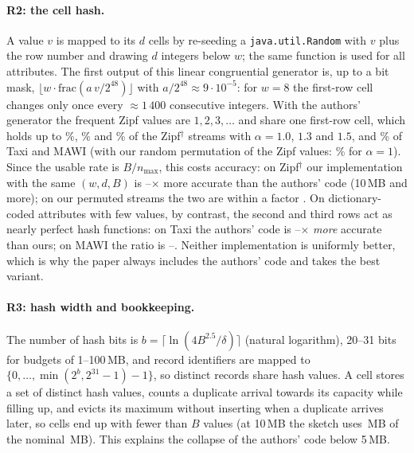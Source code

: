 \documentclass[sigconf,review,anonymous]{acmart}
\begin{document}
\paragraph{R2: the cell hash.} A value $v$ is mapped to its $d$ cells by re-seeding a
\texttt{java.util.Random} with $v$ plus the row number and drawing $d$ integers below $w$; the same function
is used for all attributes. The first output of this linear congruential generator is, up to a bit mask,
$\lfloor w\cdot\mathrm{frac}(a\,v/2^{48})\rfloor$ with $a/2^{48}\approx9\cdot10^{-5}$: for $w=8$ the
first-row cell changes only once every $\approx1\,400$ consecutive integers. With the authors' generator
the frequent Zipf values are $1,2,3,\dots$ and share one first-row cell, which holds up to
\NumRowOneShareZipfTen\%, \NumRowOneShareZipfThirteen\% and \NumRowOneShareZipfFifteen\% of the
Zipf$^\dagger$ streams with $\alpha=1.0$, $1.3$ and $1.5$, and \NumRowOneShareTaxi\% of Taxi and MAWI (with
our random permutation of the Zipf values: \NumRowOneShareOurZipfTen\% for $\alpha=1$). Since the usable
rate is $B/n_{\max}$, this costs accuracy: on Zipf$^\dagger$ our implementation with the same $(w,d,B)$ is
\NumJavaOverOursZipfDagLo--\NumJavaOverOursZipfDagHi$\times$ more accurate than the authors' code (10\,MB
and more); on our permuted streams the two are within a factor \NumJavaOverOursZipfHi. On dictionary-coded
attributes with few values, by contrast, the second and third rows act as nearly perfect hash functions:
on Taxi the authors' code is \NumOursOverJavaTaxiLo--\NumOursOverJavaTaxiHi$\times$ \emph{more} accurate
than ours; on MAWI the ratio is \NumJavaOverOursMawiLo--\NumJavaOverOursMawiHi. Neither implementation is
uniformly better, which is why the paper always includes the authors' code and takes the best variant.

\paragraph{R3: hash width and bookkeeping.} The number of hash bits is
$b=\lceil\ln(4B^{2.5}/\delta)\rceil$ (natural logarithm), 20--31 bits for budgets of 1--100\,MB, and
record identifiers are mapped to $\{0,\dots,\min(2^b,2^{31}-1)-1\}$, so distinct records share hash values.
A cell stores a set of distinct hash values, counts a duplicate arrival towards its capacity while filling
up, and evicts its maximum without inserting when a duplicate arrives later, so cells end up with fewer
than $B$ values (at 10\,MB the sketch uses \NumJavaUsedTen\,MB of the nominal \NumJavaNominalTen\,MB). This
explains the collapse of the authors' code below 5\,MB.
\end{document}
